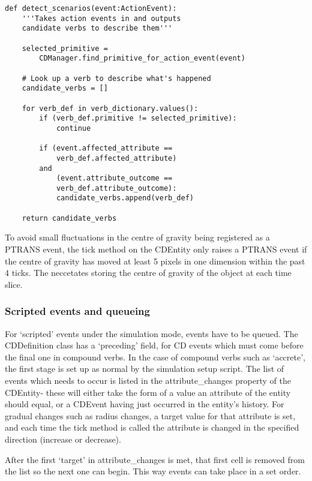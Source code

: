 \documentclass[dissertation.tex]{subfiles}
\begin{document}
\begin{lstlisting}[frame=single,caption={CDManager.detect\_scenarios method}]
def detect_scenarios(event:ActionEvent):
    '''Takes action events in and outputs
    candidate verbs to describe them'''
    
    selected_primitive =
        CDManager.find_primitive_for_action_event(event)            

    # Look up a verb to describe what's happened
    candidate_verbs = []

    for verb_def in verb_dictionary.values():
        if (verb_def.primitive != selected_primitive):
            continue

        if (event.affected_attribute ==
            verb_def.affected_attribute)
        and
            (event.attribute_outcome ==
            verb_def.attribute_outcome):
            candidate_verbs.append(verb_def)
    
    return candidate_verbs
\end{lstlisting}



    To avoid small fluctuations in the centre of gravity being registered as a PTRANS event, the tick method on the CDEntity only raises a PTRANS event if the centre of gravity has moved at least 5 pixels in one dimension within the past 4 ticks. The neccetates storing the centre of gravity of the object at each time slice.

    \subsubsection{Scripted events and queueing}
    For `scripted' events under the simulation mode, events have to be queued. The CDDefinition class has a `preceding' field, for CD events which must come before the final one in compound verbs. In the case of compound verbs such as `accrete', the first stage is set up as normal by the simulation setup script. The list of events which needs to occur is listed in the attribute\_changes property of the CDEntity- these will either take the form of a value an attribute of the entity should equal, or a CDEvent having just occurred in the entity's history. For gradual changes such as radius changes, a target value for that attribute is set, and each time the tick method is called the attribute is changed in the specified direction (increase or decrease).

    After the first `target' in attribute\_changes is met, that first cell is removed from the list so the next one can begin. This way events can take place in a set order.
\end{document}
